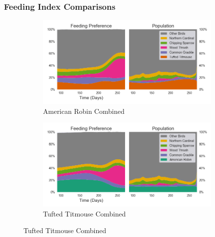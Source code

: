 \documentclass{beamer}
\begin{document}
\begin{frame}
\frametitle{Feeding Index Comparisons}
\begin{figure}
\begin{subfigure}{0.48\textwidth}
\includegraphics[width=\linewidth]{[0,6]_feedingindex.png}
\caption{American Robin Combined} \label{fig:a}
\end{subfigure}\hspace*{\fill}
\begin{subfigure}{0.48\textwidth}
\includegraphics[width=\linewidth]{[1,6]_feedingindex.png}
\caption{Tufted Titmouse Combined} \label{fig:b}
\end{subfigure}


\end{figure}
\end{frame}
\end{document}
